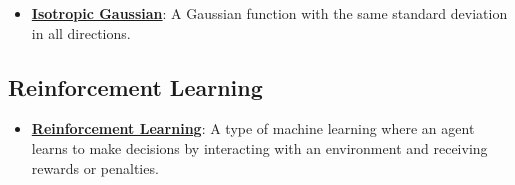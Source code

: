 \documentclass{article}%
\begin{document}
\begin{itemize}[leftmargin=*]
\item \href{https://purdue.brightspace.com/d2l/common/assets/pdfjs-d2l-dist/1.0.14-legacy/web/viewer.html?file=\%2Fcontent\%2Fenforced\%2F1095467-wl.202510.CS.24300.001\%2F08L2-Feature Extraction.pdf\%3Fou\%3D1095467\&lang=en-us\&container=d2l-fileviewer-rendered-pdf\&fullscreen=d2l-fileviewer-rendered-pdf-dialog\&height=667#page=43}{\textbf{Isotropic Gaussian}}: A Gaussian function with the same standard deviation in all directions.%
\end{itemize}

%
\subsection{Reinforcement Learning}%
\label{subsec:ReinforcementLearning}%
\begin{itemize}[leftmargin=*]%
\item \href{https://purdue.brightspace.com/d2l/common/assets/pdfjs-d2l-dist/1.0.14-legacy/web/viewer.html?file=\%2Fcontent\%2Fenforced\%2F1095467-wl.202510.CS.24300.001\%2F02L2-Intro.pdf\%3Fou\%3D1095467\&lang=en-us\&container=d2l-fileviewer-rendered-pdf\&fullscreen=d2l-fileviewer-rendered-pdf-dialog\&height=667#page=46}{\textbf{Reinforcement Learning}}: A type of machine learning where an agent learns to make decisions by interacting with an environment and receiving rewards or penalties.%
\end{itemize}

%
\end{document}
